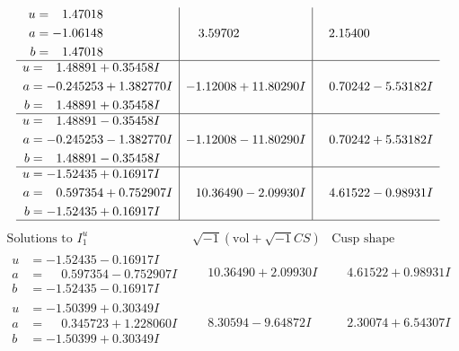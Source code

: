 \documentclass[1p]{elsarticle_modified}
\theoremstyle{definition}
\newcommand{\I}{\sqrt{-1}}
\begin{document}
$$\begin{array}{c|c|c}
\begin{aligned}
u &= \phantom{-}1.47018\phantom{ +0.000000I} \\
a &= -1.06148\phantom{ +0.000000I} \\
b &= \phantom{-}1.47018\phantom{ +0.000000I}\end{aligned}
 & \phantom{-}3.59702\phantom{ +0.000000I} & \phantom{-}2.15400\phantom{ +0.000000I} \\ \hline\begin{aligned}
u &= \phantom{-}1.48891 + 0.35458 I \\
a &= -0.245253 + 1.382770 I \\
b &= \phantom{-}1.48891 + 0.35458 I\end{aligned}
 & -1.12008 + 11.80290 I & \phantom{-}0.70242 - 5.53182 I \\ \hline\begin{aligned}
u &= \phantom{-}1.48891 - 0.35458 I \\
a &= -0.245253 - 1.382770 I \\
b &= \phantom{-}1.48891 - 0.35458 I\end{aligned}
 & -1.12008 - 11.80290 I & \phantom{-}0.70242 + 5.53182 I \\ \hline\begin{aligned}
u &= -1.52435 + 0.16917 I \\
a &= \phantom{-}0.597354 + 0.752907 I \\
b &= -1.52435 + 0.16917 I\end{aligned}
 & \phantom{-}10.36490 - 2.09930 I & \phantom{-}4.61522 - 0.98931 I\\
 \hline 
 \end{array}$$\newpage$$\begin{array}{c|c|c}  
\text{Solutions to }I^u_{1}& \I (\text{vol} + \sqrt{-1}CS) & \text{Cusp shape}\\
 \hline 
\begin{aligned}
u &= -1.52435 - 0.16917 I \\
a &= \phantom{-}0.597354 - 0.752907 I \\
b &= -1.52435 - 0.16917 I\end{aligned}
 & \phantom{-}10.36490 + 2.09930 I & \phantom{-}4.61522 + 0.98931 I \\ \hline\begin{aligned}
u &= -1.50399 + 0.30349 I \\
a &= \phantom{-}0.345723 + 1.228060 I \\
b &= -1.50399 + 0.30349 I\end{aligned}
 & \phantom{-}8.30594 - 9.64872 I & \phantom{-}2.30074 + 6.54307 I \\ \hline\begin{aligned}

\end{aligned}
\end{array}$$
\end{document}
